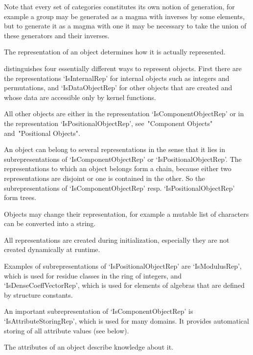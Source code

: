 Note that every set of categories constitutes its own notion of
generation, for example a group may be generated as a magma with inverses
by some elements,
but to generate it as a magma with one it may be necessary to take the
union of these generators and their inverses.


The representation of an object determines how it is actually
represented.

{\GAP} distinguishes four essentially different ways to represent
objects.
First there are the representations `IsInternalRep' for internal objects
such as integers and permutations,
and `IsDataObjectRep' for other objects that are created and whose data
are accessible only by kernel functions.


All other objects are either in the representation `IsComponentObjectRep'
or in the representation `IsPositionalObjectRep',
see~"Component Objects" and~"Positional Objects".

An object can belong to several representations in the sense that it lies
in subrepresentations of `IsComponentObjectRep' or
`IsPositionalObjectRep'.
The representations to which an object belongs form a chain, 
because either two representations are disjoint or one is contained in
the other.
So the subrepresentations of `IsComponentObjectRep' resp.
`IsPositionalObjectRep' form trees.

Objects may change their representation,
for example a mutable list of characters can be converted into a string.

All representations are created during initialization,
especially they are not created dynamically at runtime.

Examples of subrepresentations of `IsPositionalObjectRep' are
`IsModulusRep',
which is used for residue classes in the ring of integers,
and `IsDenseCoeffVectorRep',
which is used for elements of algebras that are defined by structure
constants.

An important subrepresentation of `IsComponentObjectRep' is
`IsAttributeStoringRep', which is used for many domains.
It provides automatical storing of all attribute values (see below).


The attributes of an object describe knowledge about it.

